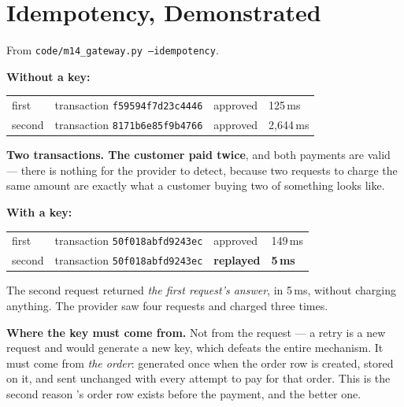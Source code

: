 \section{Idempotency, Demonstrated}

\begin{measured}
From \texttt{code/m14\_gateway.py --idempotency}.

\smallskip
\textbf{Without a key:}

\smallskip
\begin{tabular}{@{}L{3.0cm}L{5.0cm}L{2.6cm}L{3.0cm}@{}}
first & transaction \texttt{f59594f7d23c4446} & approved & 125\,ms \\
second & transaction \texttt{8171b6e85f9b4766} & approved & 2{,}644\,ms \\
\end{tabular}

\smallskip
\textbf{Two transactions. The customer paid twice}, and both payments are
valid --- there is nothing for the provider to detect, because two requests to
charge the same amount are exactly what a customer buying two of something
looks like.

\smallskip
\textbf{With a key:}

\smallskip
\begin{tabular}{@{}L{3.0cm}L{5.0cm}L{2.6cm}L{3.0cm}@{}}
first & transaction \texttt{50f018abfd9243ec} & approved & 149\,ms \\
second & transaction \texttt{50f018abfd9243ec} & \textbf{replayed} &
\textbf{5\,ms} \\
\end{tabular}

\smallskip
The second request returned \emph{the first request's answer}, in 5\,ms,
without charging anything. The provider saw four requests and charged three
times.

\smallskip
\textbf{Where the key must come from.} Not from the request --- a retry is a
new request and would generate a new key, which defeats the entire mechanism.
It must come from \emph{the order}: generated once when the order row is
created, stored on it, and sent unchanged with every attempt to pay for that
order. This is the second reason 's order row exists before the
payment, and the better one.
\end{measured}

